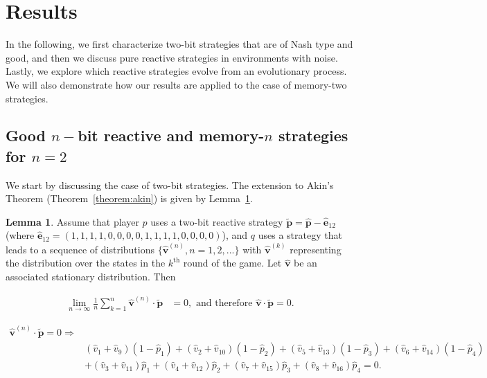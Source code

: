 \documentclass{article}
\theoremstyle{definition}
\newtheorem{lemma}[theorem]{Lemma}
\begin{document}
\section{Results}\label{section:results}

In the following, we first characterize two-bit strategies that
are of Nash type and good, and then we discuss pure reactive strategies in
environments with noise. Lastly, we explore which reactive strategies evolve
from an evolutionary process. We will also demonstrate how our results
are applied to the case of memory-two strategies.

\subsection{Good \(n-\)bit reactive and memory-\(n\) strategies for
\(n=2\)}\label{section:good_nash_strategies}

We start by discussing the case of two-bit strategies. The extension to Akin's
Theorem (Theorem~\ref{theorem:akin}) is given by Lemma~\ref{lemma:akin_extended}.

\begin{lemma}\label{lemma:akin_extended}
  Assume that player \(p\) uses a two-bit reactive strategy \(\mathbf{\tilde{p}} = \mathbf{\hat{p}} - \mathbf{\hat{e}}_{1 2}\)
  (where \(\mathbf{\hat{e}}_{1 2} = (1, 1, 1, 1, \allowbreak 0,
  0, 0, 0, 1, 1, 1, 1, 0, 0, 0, 0)\)), and \(q\) uses a strategy that leads to a sequence
  of distributions \(\{\mathbf{\hat{v}}^{(n)}, n = 1, 2, ...\}\) with
  \(\mathbf{\hat{v}}^{(k)}\) representing the distribution over the states in the
  \(k^{\text{th}}\) round of the game. Let \(\mathbf{\hat{v}}\) be an associated
  stationary distribution. Then

  \begin{align*}
    \lim_{n \rightarrow \infty} \frac{1}{n} \sum_{k=1}^{n} \mathbf{\hat{v}}^{(n)} \cdot\mathbf{\tilde{p}} & = 0, \text{ and therefore } \mathbf{\hat{v}} \cdot \mathbf{\tilde{p}} = 0.
  \end{align*}

  \begin{align}\label{eq:akin_extended}
  \mathbf{\hat{v}}^{(n)} \cdot \mathbf{\tilde{p}} = 0 \Rightarrow & \nonumber \\
  & (\hat{v}_{1} + \hat{v}_{9}) (1 - \hat{p}_1) + (\hat{v}_{2} + \hat{v}_{10}) (1 - \hat{p}_2)  + (\hat{v}_{5} + \hat{v}_{13}) (1 - \hat{p}_3) + (\hat{v}_{6} + \hat{v}_{14}) (1 - \hat{p}_4) \nonumber \\
  & + (\hat{v}_{3} + \hat{v}_{11})\hat{p}_1  + (\hat{v}_{4} + \hat{v}_{12})\hat{p}_2 + (\hat{v}_{7} + \hat{v}_{15}) \hat{p}_3 + (\hat{v}_{8} + \hat{v}_{16}) \hat{p}_4 = 0.
  \end{align}
\end{lemma}
\end{document}
